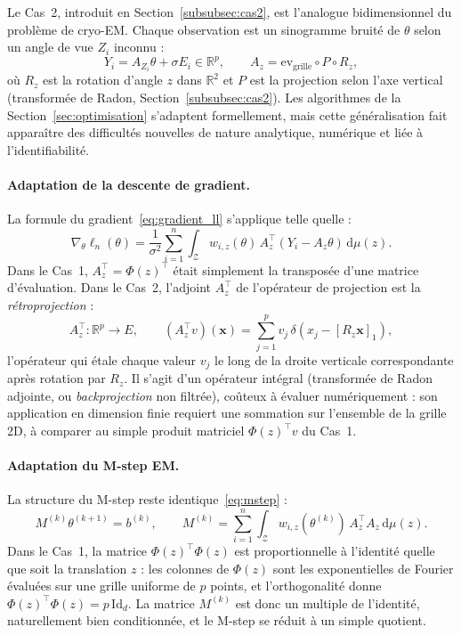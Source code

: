 \documentclass[12pt, a4paper]{article}
\theoremstyle{definition}
\newcommand{\R}{\mathbb{R}}
\newcommand{\Zcal}{\mathcal{Z}}
\newcommand{\Id}{\mathrm{Id}}
\begin{document}
Le Cas~2, introduit en Section~\ref{subsubsec:cas2}, est l'analogue bidimensionnel
du problème de cryo-EM. Chaque observation est un sinogramme bruité de $\theta$
selon un angle de vue $Z_i$ inconnu :
\[
  Y_i = A_{Z_i}\theta + \sigma E_i \in \R^p,
  \qquad
  A_z = \mathrm{ev}_{\mathrm{grille}} \circ P \circ R_z,
\]
où $R_z$ est la rotation d'angle $z$ dans $\R^2$ et $P$ est la projection selon
l'axe vertical (transformée de Radon, Section~\ref{subsubsec:cas2}).
Les algorithmes de la Section~\ref{sec:optimisation} s'adaptent formellement,
mais cette généralisation fait apparaître des difficultés nouvelles de nature
analytique, numérique et liée à l'identifiabilité.

\paragraph{Adaptation de la descente de gradient.}
La formule du gradient~\eqref{eq:gradient_ll} s'applique telle quelle :
\[
  \nabla_\theta \ell_n(\theta)
  = \frac{1}{\sigma^2}\sum_{i=1}^n
    \int_{\Zcal} w_{i,z}(\theta)\, A_z^\top(Y_i - A_z\theta)\,\mathrm{d}\mu(z).
\]
Dans le Cas~1, $A_z^\top = \Phi(z)^\top$ était simplement la transposée d'une
matrice d'évaluation. Dans le Cas~2, l'adjoint $A_z^\top$
de l'opérateur de projection est la \emph{rétroprojection} :
\[
  A_z^\top : \R^p \to E,
  \qquad
  (A_z^\top v)(\mathbf{x}) = \sum_{j=1}^p v_j\,\delta(x_j - [R_z \mathbf{x}]_1),
\]
l'opérateur qui étale chaque valeur $v_j$ le long de la droite verticale
correspondante après rotation par $R_z$. Il s'agit d'un opérateur intégral
(transformée de Radon adjointe, ou \emph{backprojection} non filtrée), coûteux
à évaluer numériquement : son application en dimension finie requiert une sommation
sur l'ensemble de la grille 2D, à comparer au simple produit matriciel $\Phi(z)^\top v$
du Cas~1.

\paragraph{Adaptation du M-step EM.}
La structure du M-step reste identique~\eqref{eq:mstep} :
\[
  M^{(k)}\theta^{(k+1)} = b^{(k)},
  \qquad
  M^{(k)} = \sum_{i=1}^n \int_{\Zcal}
  w_{i,z}(\theta^{(k)})\, A_z^\top A_z \,\mathrm{d}\mu(z).
\]
Dans le Cas~1, la matrice $\Phi(z)^\top\Phi(z)$ est proportionnelle à l'identité
quelle que soit la translation $z$ : les colonnes de $\Phi(z)$ sont les
exponentielles de Fourier évaluées sur une grille uniforme de $p$ points, et
l'orthogonalité donne $\Phi(z)^\top\Phi(z) = p\,\Id_d$.
La matrice $M^{(k)}$ est donc un multiple de l'identité, naturellement bien
conditionnée, et le M-step se réduit à un simple quotient.
\end{document}
